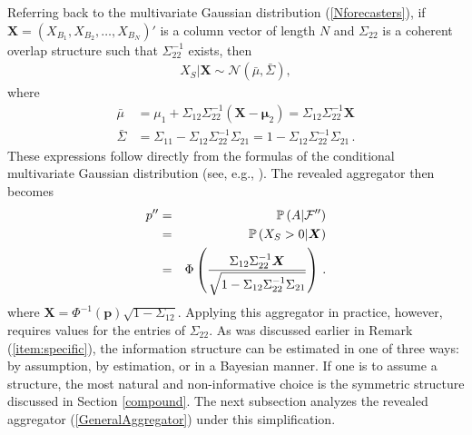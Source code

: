 \documentclass[11pt]{article}
\renewcommand{\P}{\mathbb{P}}
\theoremstyle{definition}
\theoremstyle{definition}
\def\one{{\bf 1}}
\def\F{{\cal F}}
\def\P{{\mathbb P}}
\def\probit{p_{\rm probit}}
\begin{document}
Referring back to the multivariate Gaussian distribution
(\ref{Nforecasters}), if $\boldsymbol{X} = (X_{B_1}, X_{B_2}, \dots,
X_{B_N})'$ is a column vector of length $N$ and $\Sigma_{22}$ is a
coherent overlap structure such that $\Sigma_{22}^{-1}$ exists, then
\begin{align*}
X_{S} | \boldsymbol{X} \sim \mathcal{N}\left(\bar{\mu}, \bar{\Sigma}\right), 
\end{align*}
where
\begin{align*}
\bar{\mu} &= \mu_1 + \Sigma_{12} \Sigma_{22}^{-1} 
  (\boldsymbol{X} - \boldsymbol{\mu}_2) 
  = \Sigma_{12} \Sigma_{22}^{-1} \boldsymbol{X} \\
 \bar{\Sigma}&= \Sigma_{11} - \Sigma_{12} \Sigma_{22}^{-1} \Sigma_{21} 
 = 1 - \Sigma_{12} \Sigma_{22}^{-1} \Sigma_{21}   \, .
\end{align*}
These expressions follow directly from the formulas of
the conditional multivariate Gaussian distribution (see, 
e.g., \citealt{ravishanker2001first}). 
The revealed aggregator then becomes
\begin{eqnarray}
p'' & = & \P\left(A  | \F''\right)  \nonumber \\
& = & \P\left(X_{S} > 0 | \boldsymbol{X}\right) \nonumber \\
&=& \Phi\left( \frac{\Sigma_{12} \Sigma_{22}^{-1} \boldsymbol{X}}
   {\sqrt{1 - \Sigma_{12} \Sigma_{22}^{-1} \Sigma_{21}}}\right) 
\label{GeneralAggregator} \, .
\end{eqnarray}
 where $\boldsymbol{X} =
\Phi^{-1}(\boldsymbol{p})\sqrt{1-\Sigma_{12}}$. Applying this aggregator in practice, however, requires values for the entries of $\Sigma_{22}$.
As  was discussed earlier in Remark (\ref{item:specific}), the information structure can be estimated in one of three ways: by
assumption, by estimation, or in a Bayesian manner. If one is to
assume a structure, the most natural and non-informative choice is the
symmetric structure discussed in Section \ref{compound}. The next subsection analyzes the revealed aggregator (\ref{GeneralAggregator}) under this simplification.
\end{document}
